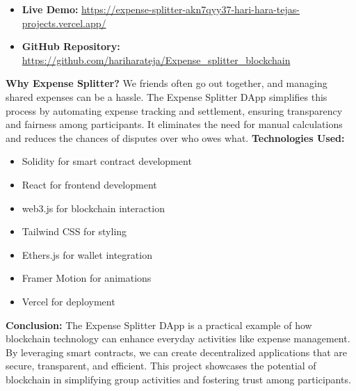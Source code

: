 \documentclass[12pt, a4paper]{article}
\begin{document}
\begin{itemize}
    \item \textbf{Live Demo:} \href{https://expense-splitter-akn7qyy37-hari-hara-tejas-projects.vercel.app/}{https://expense-splitter-akn7qyy37-hari-hara-tejas-projects.vercel.app/}
    \item \textbf{GitHub Repository:} \url{https://github.com/hariharateja/Expense_splitter_blockchain}
\end{itemize}
\textbf{Why Expense Splitter?}
We friends often go out together, and managing shared expenses can be a hassle. The Expense Splitter DApp simplifies this process by automating expense tracking and settlement, ensuring transparency and fairness among participants. It eliminates the need for manual calculations and reduces the chances of disputes over who owes what.
\newline
\textbf{Technologies Used:}
\begin{itemize}
    \item Solidity for smart contract development
    \item React for frontend development
    \item web3.js for blockchain interaction
    \item Tailwind CSS for styling
    \item Ethers.js for wallet integration
    \item Framer Motion for animations
    \item Vercel for deployment
\end{itemize}
\textbf{Conclusion:}
The Expense Splitter DApp is a practical example of how blockchain technology can enhance everyday activities like expense management. By leveraging smart contracts, we can create decentralized applications that are secure, transparent, and efficient. This project showcases the potential of blockchain in simplifying group activities and fostering trust among participants.
\end{document}
